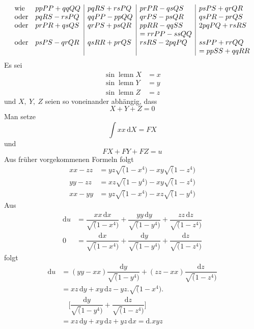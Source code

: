 \begingroup\small\setlength{\arraycolsep}{4pt}\[
\begin{array}{@{}ll|l|l|l@{}}
\text{wie}&ppPP+qqQQ&pqRS+rsPQ&prPR-qsQS&psPS+qrQR\\
\text{oder}&pqRS-rsPQ&qqPP-ppQQ&qrPS-psQR&qsPR-prQS\\
\text{oder}&prPR+qsQS&qrPS+psQR&ppRR-qqSS&2pqPQ+rsRS\\
&&&=rrPP-ssQQ&\\
\text{oder}&psPS-qrQR&qsRR+prQS&rsRS-2pqPQ&ssPP+rrQQ\\
&&&&=ppSS+qqRR
\end{array}
\]\endgroup
{}
\noindent Es sei
\[
\begin{aligned}
\sin\operatorname{lemn}X&=x\\[5pt]
\sin\operatorname{lemn}Y&=y\\[5pt]
\sin\operatorname{lemn}Z&=z
\end{aligned}
\]
\noindent und $X,\ Y,\ Z$ seien so voneinander abhängig, dass
\[
X+Y+Z=0
\]
\noindent Man setze
\[
\int xx\,\mathrm{d}X=FX
\]
\noindent und
\[
FX+FY+FZ=u
\]
\noindent Aus früher vorgekommenen Formeln folgt
\[
\begin{aligned}
xx-zz&=yz\surd(1-x^4)-xy\surd(1-z^4)\\[5pt]
yy-zz&=xz\surd(1-y^4)-xy\surd(1-z^4)\\[5pt]
xx-yy&=yz\surd(1-x^4)-xz\surd(1-y^4)
\end{aligned}
\]
\noindent Aus
\[
\begin{aligned}
\mathrm{d}u&=\dfrac{xx\,\mathrm{d}x}{\surd(1-x^4)}
+\dfrac{yy\,\mathrm{d}y}{\surd(1-y^4)}
+\dfrac{zz\,\mathrm{d}z}{\surd(1-z^4)}\\[5pt]
0&=\dfrac{\mathrm{d}x}{\surd(1-x^4)}
+\dfrac{\mathrm{d}y}{\surd(1-y^4)}
+\dfrac{\mathrm{d}z}{\surd(1-z^4)}
\end{aligned}
\]
\noindent folgt
\[
\begin{aligned}
\mathrm{d}u&=(yy-xx)\dfrac{\mathrm{d}y}{\surd(1-y^4)}
+(zz-xx)\dfrac{\mathrm{d}z}{\surd(1-z^4)}\\[5pt]
&=xz\,\mathrm{d}y+xy\,\mathrm{d}z-yz.\surd(1-x^4).
\\[7pt]&\quad{}\biggl[\dfrac{\mathrm{d}y}{\surd(1-y^4)}+\dfrac{\mathrm{d}z}{\surd(1-z^4)}\biggr]\\[5pt]
&=xz\,\mathrm{d}y+xy\,\mathrm{d}z+yz\,\mathrm{d}x=\mathrm{d}.xyz
\end{aligned}
\]

